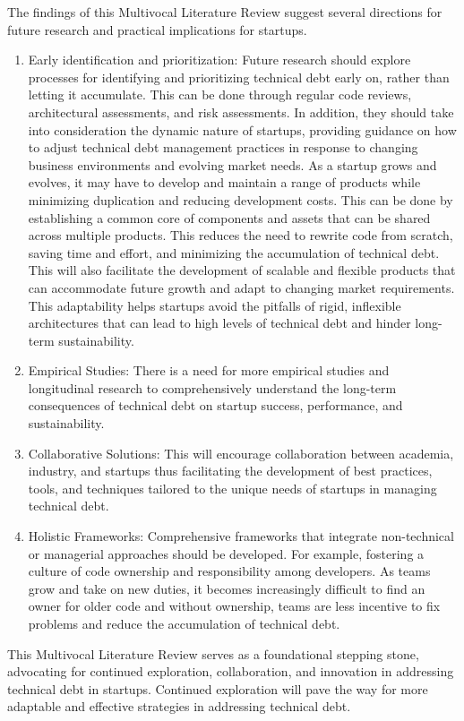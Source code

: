 The findings of this Multivocal Literature Review suggest several directions for future research and practical implications for startups.
\begin{enumerate}
    \item Early identification and prioritization: Future research should explore processes for identifying and prioritizing technical debt early on, rather than letting it accumulate.
This can be done through regular code reviews, architectural assessments, and risk assessments.
In addition, they should take into consideration the dynamic nature of startups, providing guidance on how to adjust technical debt management practices in response to changing business environments and evolving market needs.
As a startup grows and evolves, it may have to develop and maintain a range of products while minimizing duplication and reducing development costs.
This can be done by establishing a common core of components and assets that can be shared across multiple products.
This reduces the need to rewrite code from scratch, saving time and effort, and minimizing the accumulation of technical debt.
This will also facilitate the development of scalable and flexible products that can accommodate future growth and adapt to changing market requirements.
This adaptability helps startups avoid the pitfalls of rigid, inflexible architectures that can lead to high levels of technical debt and hinder long-term sustainability.
    \item Empirical Studies: There is a need for more empirical studies and longitudinal research to comprehensively understand the long-term consequences of technical debt on startup success, performance, and sustainability.
    \item Collaborative Solutions: This will encourage collaboration between academia, industry, and startups thus facilitating the development of best practices, tools, and techniques tailored to the unique needs of startups in managing technical debt.
    \item Holistic Frameworks: Comprehensive frameworks that integrate non-technical or managerial approaches should be developed.
For example, fostering a culture of code ownership and responsibility among developers.
As teams grow and take on new duties, it becomes increasingly difficult to find an owner for older code and without ownership, teams are less incentive to fix problems and reduce the accumulation of technical debt.
\end{enumerate}

This Multivocal Literature Review serves as a foundational stepping stone, advocating for continued exploration, collaboration, and innovation in addressing technical debt in startups.
Continued exploration will pave the way for more adaptable and effective strategies in addressing technical debt.
